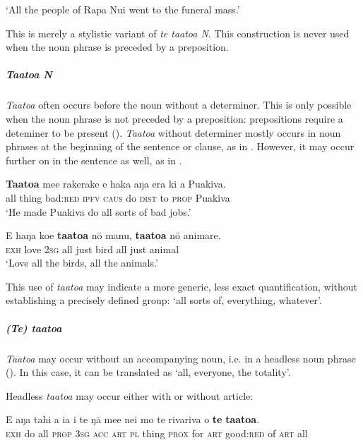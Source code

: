 \glt
‘All the people of Rapa Nui went to the funeral mass.’ \textstyleExampleref{[R231.349]}  
\z

This is merely a stylistic variant of \textit{te ta{\ꞌ}ato{\ꞌ}a N}. This construction is never used when the noun phrase is preceded by a preposition.

\subparagraph{\textit{Ta{\ꞌ}ato{\ꞌ}a N}} \textit{Ta{\ꞌ}ato{\ꞌ}a} often occurs before the noun without a determiner. This is only possible when the noun phrase is not preceded by a preposition: prepositions require a deteminer to be present (). \textit{Ta{\ꞌ}ato{\ꞌ}a} without determiner mostly occurs in noun phrases at the beginning of the sentence or clause, as in . However, it may occur further on in the sentence as well, as in .

\ea\label{ex:4.54}
\gll \textbf{Ta{\ꞌ}ato{\ꞌ}a} me{\ꞌ}e rakerake e haka aŋa era ki a Puakiva. \\
all thing bad:\textsc{red} \textsc{ipfv} \textsc{caus} do \textsc{dist} to \textsc{prop} Puakiva \\

\glt 
‘He made Puakiva do all sorts of bad jobs.’ \textstyleExampleref{[R229.397]} 
\z

\ea\label{ex:4.55}
\gll E haŋa koe \textbf{ta{\ꞌ}ato{\ꞌ}a} nō manu, \textbf{ta{\ꞌ}ato{\ꞌ}a} nō {\ꞌ}animare. \\
\textsc{exh} love \textsc{2sg} all just bird all just animal \\

\glt
‘Love all the birds, all the animals.’ \textstyleExampleref{[R213.026]} 
\z

This use of \textit{ta{\ꞌ}ato{\ꞌ}a} may indicate a more generic, less exact quantification, without establishing a precisely defined group: ‘all sorts of, everything, whatever’.

\subparagraph{\textit{(Te) ta{\ꞌ}ato{\ꞌ}a}} \textit{Ta{\ꞌ}ato{\ꞌ}a} may occur without an accompanying noun, i.e. in a headless noun phrase (). In this case, it can be translated as ‘all, everyone, the totality’. 

Headless \textit{ta{\ꞌ}ato{\ꞌ}a} may occur either with or without article:

\ea\label{ex:4.56}
\gll E aŋa tahi a ia i te ŋā me{\ꞌ}e nei mo te rivariva o \textbf{te} \textbf{ta{\ꞌ}ato{\ꞌ}a}. \\
\textsc{exh} do all \textsc{prop} \textsc{3sg} \textsc{acc} \textsc{art} \textsc{pl} thing \textsc{prox} for \textsc{art} good:\textsc{red} of \textsc{art} all \\

